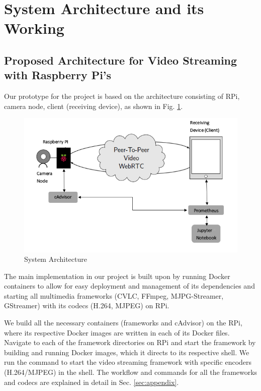 \section{System Architecture and its Working}
\label{sec:three}

\subsection{Proposed Architecture for Video Streaming with Raspberry Pi's}

Our prototype for the project is based on the architecture consisting of RPi, camera node, client (receiving device), as shown in Fig. \ref{fig:archi}.

\begin{figure}[H]
	\centering
	\includegraphics[width=\textwidth]{images/archi.png}
	\caption{System Architecture}
	\label{fig:archi}
\end{figure}


The main implementation in our project is built upon by running Docker containers to allow for easy deployment and management of its dependencies and starting all multimedia frameworks (CVLC, FFmpeg, MJPG-Streamer, GStreamer) with its codecs (H.264, MJPEG) on RPi. \par

We build all the necessary containers (frameworks and cAdvisor) on the RPi, where its respective Docker images are written in each of its Docker files. Navigate to each of the framework directories on RPi and start the framework by building and running Docker images, which it directs to its respective shell. We run the command to start the video streaming framework with specific encoders (H.264/MJPEG) in the shell. The workflow and commands for all the frameworks and codecs are explained in detail in Sec. \ref{sec:appendix}. \par

